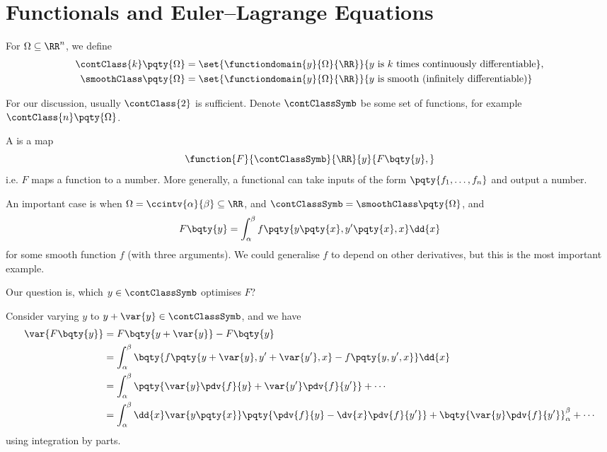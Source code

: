 \section{Functionals and Euler--Lagrange Equations}

\begin{definition}
    For \(\Omega \subseteq \RR^n\), we define
    \begin{align*}
        \contClass{k} \pqty{\Omega} &= \set{\functiondomain{y}{\Omega}{\RR}}{y \text{ is }k\text{ times continuously differentiable}}, \\
        \smoothClass \pqty{\Omega} &= \set{\functiondomain{y}{\Omega}{\RR}}{y \text{ is smooth (infinitely differentiable)}}
    \end{align*}
\end{definition}

For our discussion, usually \(\contClass{2}\) is sufficient. Denote \(\contClassSymb\) be some set of functions, for example \(\contClass{n} \pqty{\Omega}\).

\begin{definition}[Functional]
    A  is a map
    \[
        \function{F}{\contClassSymb}{\RR}{y}{F\bqty{y},}
    \]
    i.e. \(F\) maps a function to a number. More generally, a functional can take inputs of the form \(\pqty{f_1, \ldots, f_n}\) and output a number.
\end{definition}

An important case is when \(\Omega = \ccintv{\alpha}{\beta} \subseteq \RR\), and \(\contClassSymb = \smoothClass \pqty{\Omega}\), and
\[
    F\bqty{y} = \int_{\alpha}^{\beta} f\pqty{y \pqty{x}, y' \pqty{x}, x} \dd{x}
\]
for some smooth function \(f\) (with three arguments). We could generalise \(f\) to depend on other derivatives, but this is the most important example.

Our question is, which \(y \in \contClassSymb\) optimises \(F\)?

Consider varying \(y\) to \(y + \var{y} \in \contClassSymb\), and we have
\begin{align*}
    \var{F\bqty{y}} &= F\bqty{y + \var{y}} - F\bqty{y} \\
    &= \int_{\alpha}^{\beta} \bqty{f \pqty{y + \var{y}, y' + \var{y'}, x} - f \pqty{y, y', x}} \dd{x} \\
    &= \int_{\alpha}^{\beta} \pqty{\var{y} \pdv{f}{y} + \var{y'} \pdv{f}{y'}} + \cdots\\
    &= \int_{\alpha}^{\beta} \dd{x} \var{y\pqty{x}} \pqty{\pdv{f}{y} - \dv{x} \pdv{f}{y'}} + \bqty{\var{y} \pdv{f}{y'}}_{\alpha}^{\beta} + \cdots
\end{align*}
using integration by parts.

